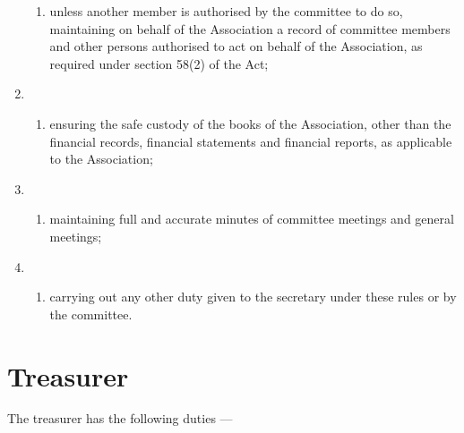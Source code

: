 \begin{enumerate}
\begin{enumerate}
  \item unless another member is authorised by the committee to do so, maintaining on behalf of the Association a record of committee members and other persons authorised to act on behalf of the Association, as required under section 58(2) of the Act;
  \end{enumerate}
\item \begin{enumerate}
  \def\labelenumi{\alph{enumi})}
  \setcounter{enumi}{6}
  
  \item ensuring the safe custody of the books of the Association, other than the financial records, financial statements and financial reports, as applicable to the Association;
  \end{enumerate}
\item \begin{enumerate}
  \def\labelenumi{\alph{enumi})}
  \setcounter{enumi}{7}
  
  \item maintaining full and accurate minutes of committee meetings and general meetings;
  \end{enumerate}
\item \begin{enumerate}
  \def\labelenumi{\roman{enumi})}
  
  \item carrying out any other duty given to the secretary under these rules or by the committee.
  \end{enumerate}
\end{enumerate}

\hypertarget{treasurer}{%
\section{Treasurer}\label{treasurer}}

The treasurer has the following duties ---

